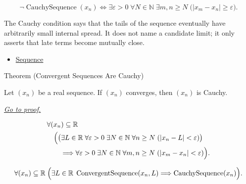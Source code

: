 \begin{remark*}
\[
\neg\operatorname{CauchySequence}(x_n)
\Longleftrightarrow
\exists \varepsilon>0 \;\forall N\in\mathbb{N}\;\exists m,n\ge N
\;\bigl(|x_m-x_n|\ge\varepsilon\bigr).
\]
\end{remark*}

\begin{remark*}[Interpretation]
The Cauchy condition says that the tails of the sequence eventually have
arbitrarily small internal spread. It does not name a candidate limit; it
only asserts that late terms become mutually close.
\end{remark*}

\begin{dependencies}
\begin{itemize}
  \item \hyperref[def:sequence]{Sequence}
\end{itemize}
\end{dependencies}


\begin{theorembox}{Theorem (Convergent Sequences Are Cauchy)}
\begin{theorem}
\label{thm:convergent-sequences-are-cauchy}
Let $(x_n)$ be a real sequence. If $(x_n)$ converges, then $(x_n)$ is
Cauchy.

\smallskip
\noindent
\hyperref[prf:convergent-sequences-are-cauchy]{\textit{Go to proof.}}
\end{theorem}
\end{theorembox}

\begin{remark*}
\[
\begin{aligned}
&\forall (x_n)\subseteq\mathbb{R}\\
&\quad
\Bigl(
  \bigl(\exists L\in\mathbb{R}\;\forall \varepsilon>0\;\exists N\in\mathbb{N}
  \;\forall n\ge N\;( |x_n-L|<\varepsilon )\bigr)\\
&\qquad\Longrightarrow
  \forall \varepsilon>0\;\exists N\in\mathbb{N}\;\forall m,n\ge N
  \;( |x_m-x_n|<\varepsilon )
\Bigr).
\end{aligned}
\]
\end{remark*}

\begin{remark*}
\[
\forall (x_n)\subseteq\mathbb{R}\;
\Bigl(
  \exists L\in\mathbb{R}\;\operatorname{ConvergentSequence}(x_n,L)
  \Longrightarrow
  \operatorname{CauchySequence}(x_n)
\Bigr).
\]
\end{remark*}

